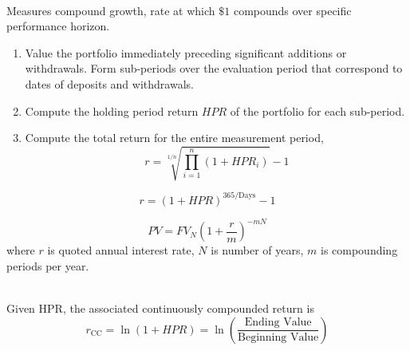 \begin{definition} \\
Measures compound growth, rate at which $\$1$ compounds over specific performance horizon.
\begin{enumerate}[label=\arabic*.]
\setlength{\itemsep}{0pt}
\item Value the portfolio immediately preceding significant additions or withdrawals. Form sub-periods over the evaluation period that correspond to dates of deposits and withdrawals.
\item Compute the holding period return $HPR$ of the portfolio for each sub-period.
\item Compute the total return for the entire measurement period,
\begin{equation}
r = \sqrt[1/n]{\prod\limits_{i=1}^n (1+HPR_i)} - 1 \nonumber
\end{equation}
\end{enumerate}
\end{definition}

\begin{definition} 
\begin{equation}
r = (1+HPR)^{365/\text{Days}} - 1 \nonumber
\end{equation}
\end{definition}

\begin{definition} 
\begin{equation}
PV = FV_N \left(1 + \frac{r}{m} \right)^{-mN} \nonumber
\end{equation}
where $r$ is quoted annual interest rate, $N$ is number of years, $m$ is compounding periods per year.
\end{definition}

\begin{definition} \\
Given HPR, the associated continuously compounded return is
\begin{equation}
r_{\text{CC}} = \ln(1+HPR) = \ln \left(\frac{\text{Ending Value}}{\text{Beginning Value}} \right) \nonumber
\end{equation}
\end{definition}

\newpage

